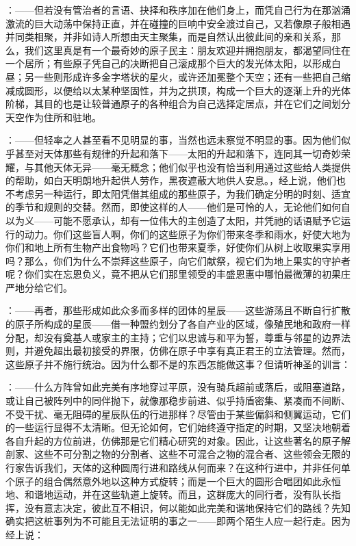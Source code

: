 ：——但若没有管治者的言语、抉择和秩序加在他们身上，而凭自己行为在那汹涌激流的巨大动荡中保持正直，并在碰撞的巨响中安全渡过自己，又若像原子般相遇并同类相聚，并非如诗人所想由天主聚集，而是自然认出彼此间的亲和关系，那么，我们这里真是有一个最奇妙的原子民主：朋友欢迎并拥抱朋友，都渴望同住在一个居所；有些原子凭自己的决断把自己滚成那个巨大的发光体太阳，以形成白昼；另一些则形成许多金字塔状的星火，或许还加冕整个天空；还有一些把自己缩减成圆形，以便给以太某种坚固性，并为之拱顶，构成一个巨大的逐渐上升的光体阶梯，其目的也是让较普通原子的各种组合为自己选择定居点，并在它们之间划分天空作为住所和驻地。\par

：——但轻率之人甚至看不见明显的事，当然也远未察觉不明显的事。因为他们似乎甚至对天体那些有规律的升起和落下——太阳的升起和落下，连同其一切奇妙荣耀，与其他天体无异——毫无概念；他们似乎也没有恰当利用通过这些给人类提供的帮助，如白天明朗地升起供人劳作，黑夜遮蔽大地供人安息。，经上说，他们也不考虑另一种运行，即太阳凭借其组成的那些原子，为我们确定分明的时刻、适宜的季节和规则的交替。然而，即使这样的人——他们是可怜的人，无论他们如何自以为义——可能不愿承认，却有一位伟大的主创造了太阳，并凭祂的话语赋予它运行的动力。你们这些盲人啊，你们的这些原子为你们带来冬季和雨水，好使大地为你们和地上所有生物产出食物吗？它们也带来夏季，好使你们从树上收取果实享用吗？那么，你们为什么不崇拜这些原子，向它们献祭，视它们为地上果实的守护者呢？你们实在忘恩负义，竟不把从它们那里领受的丰盛恩惠中哪怕最微薄的初果庄严地分给它们。\par

：——再者，那些形成如此众多而多样的团体的星辰——这些游荡且不断自行扩散的原子所构成的星辰——借一种盟约划分了各自产业的区域，像殖民地和政府一样分配，却没有奠基人或家主的主持；它们以忠诚与和平为誓，尊重与邻星的边界法则，并避免超出最初接受的界限，仿佛在原子中享有真正君王的立法管理。然而，这些原子并不施行统治。因为什么都不是的东西怎能做这事？但请听神圣的训言： \par

：——什么方阵曾如此完美有序地穿过平原，没有骑兵超前或落后，或阻塞道路，或让自己被阵列中的同伴抛下，就像那稳步前进、似乎持盾密集、紧凑而不间断、不受干扰、毫无阻碍的星辰队伍的行进那样？尽管由于某些偏斜和侧翼运动，它们的一些运行显得不太清晰。但无论如何，它们始终遵守指定的时期，又坚决地朝着各自升起的方位前进，仿佛那是它们精心研究的对象。因此，让这些著名的原子解剖家、这些不可分割之物的分割者、这些不可混合之物的混合者、这些领会无限的行家告诉我们，天体的这种圆周行进和路线从何而来？在这种行进中，并非任何单个原子的组合偶然意外地以这种方式旋转；而是一个巨大的圆形合唱团如此永恒地、和谐地运动，并在这些轨道上旋转。而且，这群庞大的同行者，没有队长指挥，没有意志决定，彼此互不相识，何以能如此完美和谐地保持它们的路线？先知确实把这桩事列为不可能且无法证明的事之一——即两个陌生人应一起行走。因为经上说：\par

